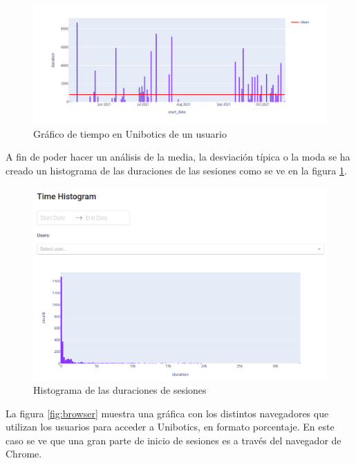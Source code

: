 \begin{figure}[H]
    \centering
    \includegraphics[width=18cm, keepaspectratio]{img/time_user.png}
    \caption{Gráfico de tiempo en Unibotics de un usuario}
    \label{fig:time_user}
\end{figure}
A fin de poder hacer un análisis de la media, la desviación típica o la moda se ha creado un histograma de las duraciones de las sesiones como se ve en la figura \ref{fig:time_user}.
\begin{figure}[H]
    \centering
    \includegraphics[width=16cm, keepaspectratio]{img/time_histogram.png}
    \caption{Histograma de las duraciones de sesiones}
    \label{fig:time_histogram}
\end{figure}
\newpage
La figura \ref{fig:browser} muestra una gráfica con los distintos navegadores que utilizan los usuarios para acceder a Unibotics,  en formato porcentaje. En este caso se ve que una gran parte de inicio de sesiones es a través del navegador de Chrome.



